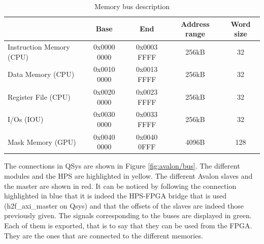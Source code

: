 \begin{table}[H]
    \centering
    \begin{tabular}{|l|c|c|c|c|}
    \hline
    \rowcolor[HTML]{DAE8FC} 
    \multicolumn{1}{|c|}{\cellcolor[HTML]{DAE8FC}\textbf{Access}} & \textbf{Base} & \textbf{End} & \textbf{Address range} & \textbf{Word size} \\ \hline
    Instruction Memory (CPU)                                      & 0x0000 0000   & 0x0003 FFFF  & 256kB             & 32                 \\ \hline
    Data Memory (CPU)                                             & 0x0010 0000   & 0x0013 FFFF  & 256kB             & 32                 \\ \hline
    Register File (CPU)                                           & 0x0020 0000   & 0x0023 FFFF  & 256kB             & 32                 \\ \hline
    I/Os (IOU)                                                    & 0x0030 0000   & 0x0033 FFFF  & 256kB             & 32                 \\ \hline
    Mask Memory (GPU)                                             & 0x0040 0000   & 0x0040 0FFF  & 4096B             & 128                \\ \hline
    \end{tabular}
    \caption{Memory bus description}
    \label{mau/bus}
\end{table}

The connections in QSys are shown in Figure \ref{fig:avalon/bus}. 
The different modules and the HPS are highlighted in 
yellow. The different Avalon slaves and the master are shown in red. It can be noticed by following 
the connection highlighted in blue that it is indeed the HPS-FPGA bridge that is used 
(h2f\_axi\_master on Qsys) and that the offsets of the slaves are indeed those previously given. The 
signals corresponding to the buses are displayed in green. Each of them is exported, that is to say 
that they can be used from the FPGA. They are the ones that are connected to the different memories.

